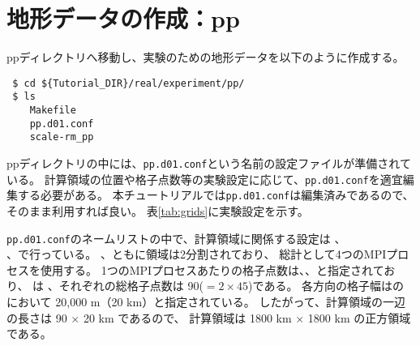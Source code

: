 \section{地形データの作成：pp} \label{sec:tutorial_real_pp}

ppディレクトリへ移動し、実験のための地形データを以下のように作成する。
\begin{verbatim}
 $ cd ${Tutorial_DIR}/real/experiment/pp/
 $ ls
    Makefile
    pp.d01.conf
    scale-rm_pp
\end{verbatim}
ppディレクトリの中には、\verb|pp.d01.conf|という名前の設定ファイルが準備されている。
計算領域の位置や格子点数等の実験設定に応じて、\verb|pp.d01.conf|を適宜編集する必要がある。
本チュートリアルでは\verb|pp.d01.conf|は編集済みであるので、そのまま利用すれば良い。
表\ref{tab:grids}に実験設定を示す。

\verb|pp.d01.conf|のネームリストの中で、計算領域に関係する設定は 、\\
、で行っている。
{\XDIR} 、{\YDIR}ともに領域は2分割されており、
総計として4つのMPIプロセスを使用する。
1つのMPIプロセスあたりの格子点数は、、と指定されており、
は{\XDIR} 、{\YDIR}それぞれの総格子点数は 90($=2 \times 45$)である。
各方向の格子幅はのにおいて 20,000 m（20 km）と指定されている。
したがって、計算領域の一辺の長さは 90 $\times$ 20 km であるので、
計算領域は 1800 km $\times$ 1800 km の正方領域である。

